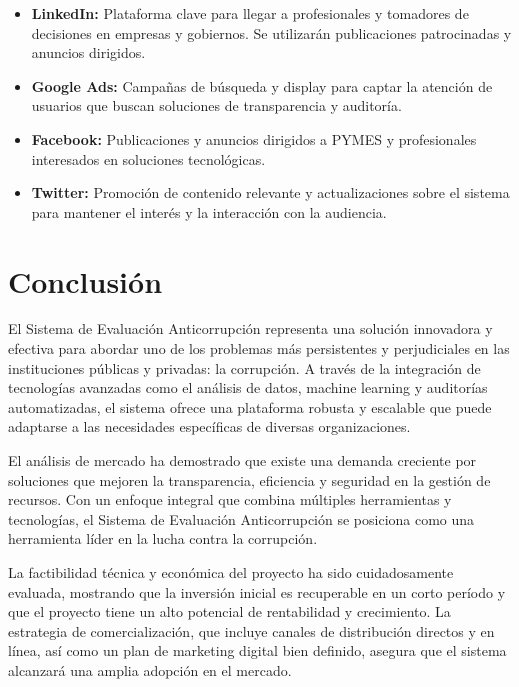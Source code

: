\documentclass[a4paper,12pt]{article}
\begin{document}
\begin{itemize}
    \item \textbf{LinkedIn:} Plataforma clave para llegar a profesionales y tomadores de decisiones en empresas y gobiernos. Se utilizarán publicaciones patrocinadas y anuncios dirigidos.
    \item \textbf{Google Ads:} Campañas de búsqueda y display para captar la atención de usuarios que buscan soluciones de transparencia y auditoría.
    \item \textbf{Facebook:} Publicaciones y anuncios dirigidos a PYMES y profesionales interesados en soluciones tecnológicas.
    \item \textbf{Twitter:} Promoción de contenido relevante y actualizaciones sobre el sistema para mantener el interés y la interacción con la audiencia.
\end{itemize}

\section{Conclusión}
El Sistema de Evaluación Anticorrupción representa una solución innovadora y efectiva para abordar uno de los problemas más persistentes y perjudiciales en las instituciones públicas y privadas: la corrupción. A través de la integración de tecnologías avanzadas como el análisis de datos, machine learning y auditorías automatizadas, el sistema ofrece una plataforma robusta y escalable que puede adaptarse a las necesidades específicas de diversas organizaciones.

El análisis de mercado ha demostrado que existe una demanda creciente por soluciones que mejoren la transparencia, eficiencia y seguridad en la gestión de recursos. Con un enfoque integral que combina múltiples herramientas y tecnologías, el Sistema de Evaluación Anticorrupción se posiciona como una herramienta líder en la lucha contra la corrupción.

La factibilidad técnica y económica del proyecto ha sido cuidadosamente evaluada, mostrando que la inversión inicial es recuperable en un corto período y que el proyecto tiene un alto potencial de rentabilidad y crecimiento. La estrategia de comercialización, que incluye canales de distribución directos y en línea, así como un plan de marketing digital bien definido, asegura que el sistema alcanzará una amplia adopción en el mercado.
\end{document}
